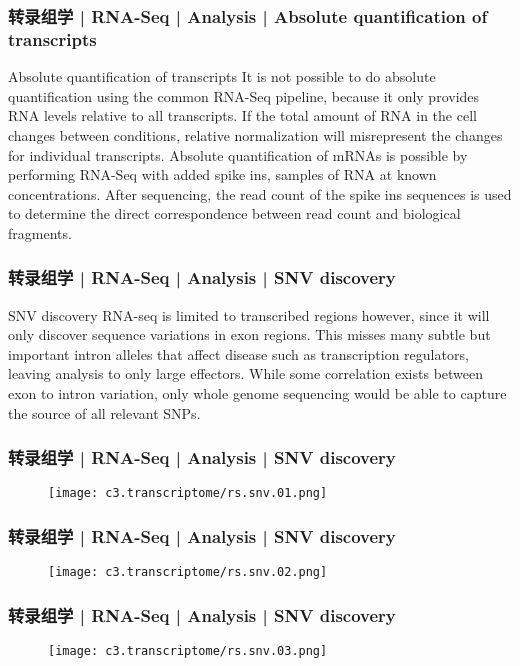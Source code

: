 \begin{frame}
  \frametitle{转录组学 | RNA-Seq | Analysis | Absolute quantification of transcripts}
  \begin{block}{Absolute quantification of transcripts}
 It is not possible to do absolute quantification using the common RNA-Seq pipeline, because it only provides RNA levels relative to all transcripts. If the total amount of RNA in the cell changes between conditions, relative normalization will misrepresent the changes for individual transcripts. Absolute quantification of mRNAs is possible by performing RNA-Seq with added spike ins, samples of RNA at known concentrations. After sequencing, the read count of the spike ins sequences is used to determine the direct correspondence between read count and biological fragments.
  \end{block}
\end{frame}

\begin{frame}
  \frametitle{转录组学 | RNA-Seq | Analysis | SNV discovery}
  \begin{block}{SNV discovery}
    RNA-seq is limited to transcribed regions however, since it will only discover sequence variations in exon regions. This misses many subtle but important intron alleles that affect disease such as transcription regulators, leaving analysis to only large effectors. While some correlation exists between exon to intron variation, only whole genome sequencing would be able to capture the source of all relevant SNPs.
  \end{block}
\end{frame}

\begin{frame}
  \frametitle{转录组学 | RNA-Seq | Analysis | SNV discovery}
  \begin{figure}
    \centering
    \texttt{[image: c3.transcriptome/rs.snv.01.png]}
  \end{figure}
\end{frame}

\begin{frame}
  \frametitle{转录组学 | RNA-Seq | Analysis | SNV discovery}
  \begin{figure}
    \centering
    \texttt{[image: c3.transcriptome/rs.snv.02.png]}
  \end{figure}
\end{frame}

\begin{frame}
  \frametitle{转录组学 | RNA-Seq | Analysis | SNV discovery}
  \begin{figure}
    \centering
    \texttt{[image: c3.transcriptome/rs.snv.03.png]}
  \end{figure}
\end{frame}


